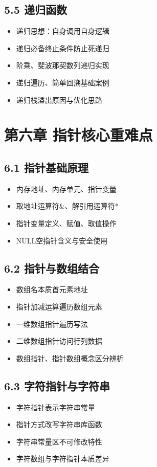 \subsection*{5.5 递归函数}
\begin{itemize}
\item 递归思想：自身调用自身逻辑
\item 递归必备终止条件防止死递归
\item 阶乘、斐波那契数列递归实现
\item 递归遍历、简单回溯基础案例
\item 递归栈溢出原因与优化思路
\end{itemize}

\section*{第六章 指针核心重难点}
\subsection*{6.1 指针基础原理}
\begin{itemize}
\item 内存地址、内存单元、指针变量
\item 取地址运算符\&、解引用运算符*
\item 指针变量定义、赋值、取值操作
\item NULL空指针含义与安全使用
\end{itemize}

\subsection*{6.2 指针与数组结合}
\begin{itemize}
\item 数组名本质首元素地址
\item 指针加减运算遍历数组元素
\item 一维数组指针遍历写法
\item 二维数组指针访问行列数据
\item 数组指针、指针数组概念区分辨析
\end{itemize}

\subsection*{6.3 字符指针与字符串}
\begin{itemize}
\item 字符指针表示字符串常量
\item 指针方式改写字符串库函数
\item 字符串常量区不可修改特性
\item 字符数组与字符指针本质差异
\end{itemize}

